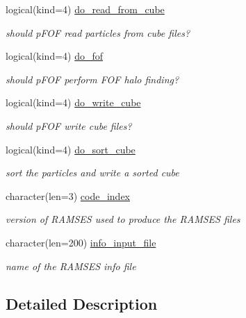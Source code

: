 \begin{DoxyCompactItemize}
logical(kind=4) \hyperlink{structmodconstant_1_1type__parameter__pfof__snap_a2eda60cfcb05e14b859d4912c4301700}{do\+\_\+read\+\_\+from\+\_\+cube}
\begin{DoxyCompactList}\small\item\em should p\+F\+OF read particles from cube files? \end{DoxyCompactList}\item 
logical(kind=4) \hyperlink{structmodconstant_1_1type__parameter__pfof__snap_acb40ca8aaf934ee56cf5233d3bca0be0}{do\+\_\+fof}
\begin{DoxyCompactList}\small\item\em should p\+F\+OF perform F\+OF halo finding? \end{DoxyCompactList}\item 
logical(kind=4) \hyperlink{structmodconstant_1_1type__parameter__pfof__snap_a3080ade093c18c757c10ee8b18b03db0}{do\+\_\+write\+\_\+cube}
\begin{DoxyCompactList}\small\item\em should p\+F\+OF write cube files? \end{DoxyCompactList}\item 
logical(kind=4) \hyperlink{structmodconstant_1_1type__parameter__pfof__snap_a69d97a99b9550658ab3d32d614591afd}{do\+\_\+sort\+\_\+cube}
\begin{DoxyCompactList}\small\item\em sort the particles and write a \textquotesingle{}sorted cube\textquotesingle{} \end{DoxyCompactList}\item 
character(len=3) \hyperlink{structmodconstant_1_1type__parameter__pfof__snap_a08a341a76feda6a632e6ff16050c7e3e}{code\+\_\+index}
\begin{DoxyCompactList}\small\item\em version of R\+A\+M\+S\+ES used to produce the R\+A\+M\+S\+ES files \end{DoxyCompactList}\item 
character(len=200) \hyperlink{structmodconstant_1_1type__parameter__pfof__snap_a0337983bc6b424f1291afffd5f318eae}{info\+\_\+input\+\_\+file}
\begin{DoxyCompactList}\small\item\em name of the R\+A\+M\+S\+ES info file \end{DoxyCompactList}\end{DoxyCompactItemize}


\subsection{Detailed Description}


